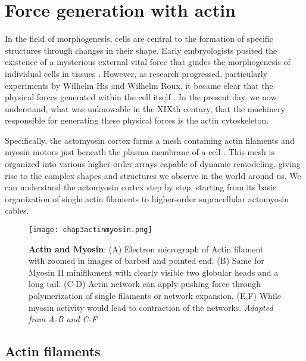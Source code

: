 \hypertarget{force-generation-with-actin}{%
	\section{Force generation with
		actin}\label{force-generation-with-actin}}

In the field of morphogenesis, cells are central to the formation of specific structures through changes in their shape. Early embryologists posited the existence of a mysterious external vital force that guides the morphogenesis of individual cells in tissues \cite{thompson1979}. However, as research progressed, particularly experiments by Wilhelm His and Wilhelm Roux, it became clear that the physical forces generated within the cell itself \cite{clarke2021}. In the present day, we now understand, what was unknowable in the XIXth century, that the machinery responsible for generating these physical forces is the actin cytoskeleton.

Specifically, the actomyosin cortex forms a mesh containing actin filaments and myosin motors just beneath the plasma membrane of a cell \cite{alberts2015}. This mesh is organized into various higher-order arrays capable of dynamic remodeling, giving rise to the complex shapes and structures we observe in the world around us. We can understand the actomyosin cortex step by step, starting from its basic organization of single actin filaments to higher-order supracellular actomyosin cables.

\begin{figure}
	\centering
	\texttt{[image: chap3actinmyosin.png]}
	\caption{\label{fig_3_1} \textbf{Actin and Myosin}: (A) Electron micrograph of Actin filament with zoomed in images of barbed and pointed end. (B) Same for Myosin II minifilament with clearly visible two globular heads and a long tail. (C-D) Actin network can apply pushing force through polymerization of single filaments or network expansion. (E,F) While myosin activity would lead to contraction of the networks. \textit{Adapted from A-B \cite{alberts2015} and C-F \cite{clarke2021}}
	}
\end{figure}

\hypertarget{actin-filaments}{%
	\subsection{Actin filaments}\label{actin-filaments}}


